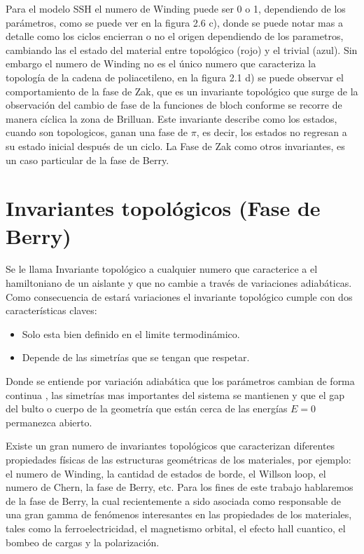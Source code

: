 Para el modelo SSH el numero de Winding puede ser 0 o 1, dependiendo de los parámetros, como se puede ver en la figura 2.6 c), donde se puede notar mas a detalle como los ciclos encierran o no el origen dependiendo de los parametros, cambiando las el estado del material entre topológico (rojo) y el trivial (azul). 
Sin embargo el numero de Winding no es el único numero que caracteriza la topología de la cadena de poliacetileno, en la figura 2.1 d) se puede observar el comportamiento de la fase de Zak, que es un invariante topológico que surge de la observación del cambio de fase de la funciones de bloch conforme se recorre de manera cíclica la zona de Brilluan. Este invariante describe como los estados, cuando son topologicos, ganan una fase de $\pi$, es decir, los estados no regresan a su estado inicial después de un ciclo. La Fase de Zak como otros invariantes, es un caso particular de la fase de Berry.

\section{Invariantes topológicos (Fase de Berry)}

Se le llama Invariante topológico a cualquier numero que caracterice a el hamiltoniano de un aislante y que no cambie a través de variaciones adiabáticas. Como consecuencia de estará variaciones el invariante topológico cumple con dos características claves:
\begin{itemize}
    \item Solo esta bien definido en el limite termodinámico.
    \item Depende de las simetrías que se tengan que respetar.
\end{itemize}

Donde se entiende por variación adiabática que los parámetros cambian de forma continua , las simetrías mas importantes del sistema se mantienen y que el gap del bulto o cuerpo de la geometría que están cerca de las energías $E=0$ permanezca abierto.

Existe un gran numero de invariantes topológicos que caracterizan diferentes propiedades físicas de las estructuras geométricas de los materiales, por ejemplo: el numero de Winding, la cantidad de estados de borde, el Willson loop, el numero de Chern, la fase de Berry, etc. Para los fines de este trabajo hablaremos de la fase de Berry, la cual recientemente a sido asociada como responsable de una gran gamma de fenómenos interesantes en las propiedades de los materiales, tales como la ferroelectricidad, el magnetismo orbital, el efecto hall cuantico, el bombeo de cargas y la polarización.

